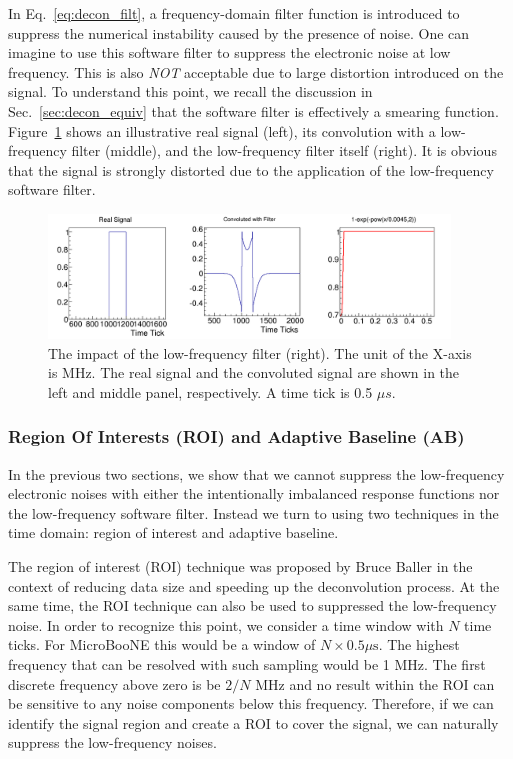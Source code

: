 \label{sec:low_freq_filter}

In Eq.~\eqref{eq:decon_filt}, a frequency-domain  filter function is introduced 
to suppress the numerical instability caused by the presence of noise. One can imagine to use this
software filter to suppress the electronic noise at low frequency. This is also 
{\it NOT} acceptable due to large distortion introduced on the signal. To understand this 
point, we recall the discussion in Sec.~\ref{sec:decon_equiv} that the software filter 
is effectively a smearing function. Figure~\ref{fig:low_f_filter} shows an illustrative 
real signal (left), its convolution with a low-frequency filter (middle), and 
the low-frequency filter itself (right). It is obvious that the signal is strongly 
distorted due to the application of the low-frequency software filter. 

\begin{figure}[htb]
\centering
\includegraphics[width=0.95\textwidth]{figures/low_freq.png}
\caption{The impact of the low-frequency filter (right). The unit of the X-axis 
is MHz.  The real signal and the convoluted signal are shown in the left and
middle panel, respectively. A time tick is 0.5 $\mu s$.}
\label{fig:low_f_filter}
\end{figure}

\subsubsection{Region Of Interests (ROI) and Adaptive Baseline (AB)}\label{sec:roi_ab}

In the previous two sections, we show that we cannot suppress the low-frequency 
electronic noises with either the intentionally imbalanced response functions nor 
the low-frequency software filter. 
Instead we turn to using two techniques in the time domain: region of interest and 
adaptive baseline. 

The region of interest (ROI) technique
was proposed by Bruce Baller in the context of reducing data size and speeding up the 
deconvolution process. At the same time, the ROI technique can also be used to 
suppressed the low-frequency noise. In order to recognize this point, we consider
a time window with $N$ time ticks.  For MicroBooNE this would be a window of $N\times0.5\mu\mbox{s}$.
The highest frequency that can be resolved with such sampling would be 
1 MHz. The first discrete frequency above zero is be $2/N$ MHz and no result
within the ROI can be sensitive 
to any noise components below this frequency.  Therefore, if we can identify 
the signal region and create a ROI to cover the signal, we can naturally suppress 
the low-frequency noises. 

